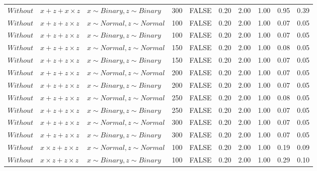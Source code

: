 \begin{longtable}{lllrlrrrrr}
  $Without$ & $\textit{x} + \textit{z} + \textit{x} \times \textit{z}$ & $\textit{x} \sim Binary, \textit{z} \sim Binary$ & 300 & FALSE & 0.20 & 2.00 & 1.00 & 0.95 & 0.39 \\ 
  $Without$ & $\textit{x} + \textit{z} + \textit{z} \times \textit{z}$ & $\textit{x} \sim Normal , \textit{z} \sim Normal$ & 100 & FALSE & 0.20 & 2.00 & 1.00 & 0.07 & 0.05 \\ 
  $Without$ & $\textit{x} + \textit{z} + \textit{z} \times \textit{z}$ & $\textit{x} \sim Binary, \textit{z} \sim Binary$ & 100 & FALSE & 0.20 & 2.00 & 1.00 & 0.07 & 0.05 \\ 
  $Without$ & $\textit{x} + \textit{z} + \textit{z} \times \textit{z}$ & $\textit{x} \sim Normal , \textit{z} \sim Normal$ & 150 & FALSE & 0.20 & 2.00 & 1.00 & 0.08 & 0.05 \\ 
  $Without$ & $\textit{x} + \textit{z} + \textit{z} \times \textit{z}$ & $\textit{x} \sim Binary, \textit{z} \sim Binary$ & 150 & FALSE & 0.20 & 2.00 & 1.00 & 0.07 & 0.05 \\ 
  $Without$ & $\textit{x} + \textit{z} + \textit{z} \times \textit{z}$ & $\textit{x} \sim Normal , \textit{z} \sim Normal$ & 200 & FALSE & 0.20 & 2.00 & 1.00 & 0.07 & 0.05 \\ 
  $Without$ & $\textit{x} + \textit{z} + \textit{z} \times \textit{z}$ & $\textit{x} \sim Binary, \textit{z} \sim Binary$ & 200 & FALSE & 0.20 & 2.00 & 1.00 & 0.07 & 0.05 \\ 
  $Without$ & $\textit{x} + \textit{z} + \textit{z} \times \textit{z}$ & $\textit{x} \sim Normal , \textit{z} \sim Normal$ & 250 & FALSE & 0.20 & 2.00 & 1.00 & 0.08 & 0.05 \\ 
  $Without$ & $\textit{x} + \textit{z} + \textit{z} \times \textit{z}$ & $\textit{x} \sim Binary, \textit{z} \sim Binary$ & 250 & FALSE & 0.20 & 2.00 & 1.00 & 0.07 & 0.05 \\ 
  $Without$ & $\textit{x} + \textit{z} + \textit{z} \times \textit{z}$ & $\textit{x} \sim Normal , \textit{z} \sim Normal$ & 300 & FALSE & 0.20 & 2.00 & 1.00 & 0.07 & 0.05 \\ 
  $Without$ & $\textit{x} + \textit{z} + \textit{z} \times \textit{z}$ & $\textit{x} \sim Binary, \textit{z} \sim Binary$ & 300 & FALSE & 0.20 & 2.00 & 1.00 & 0.07 & 0.05 \\ 
  $Without$ & $\textit{x} \times \textit{z} + \textit{z} \times \textit{z}$ & $\textit{x} \sim Normal , \textit{z} \sim Normal$ & 100 & FALSE & 0.20 & 2.00 & 1.00 & 0.19 & 0.09 \\ 
  $Without$ & $\textit{x} \times \textit{z} + \textit{z} \times \textit{z}$ & $\textit{x} \sim Binary, \textit{z} \sim Binary$ & 100 & FALSE & 0.20 & 2.00 & 1.00 & 0.29 & 0.10 \\ 

\end{longtable}
